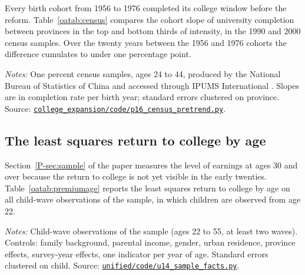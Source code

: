 \documentclass[11pt]{article}
\numberwithin{equation}{section}
\newcommand{\repourl}{https://github.com/JiachenJin1001/family-background-earnings-china}
\newcommand{\code}[1]{\href{\repourl/blob/main/#1}{\nolinkurl{#1}}}
\begin{document}
Every birth cohort from 1956 to 1976 completed its college window
before the reform. Table~\ref{oatab:census} compares the cohort slope
of university completion between provinces in the top and bottom
thirds of intensity, in the 1990 and 2000 census samples. Over the twenty years between the 1956 and 1976 cohorts the difference cumulates to under one percentage point.

\begin{table}[H]
\centering
\small
\caption{Difference in pre-reform cohort slopes of university
completion, provinces in the top third of intensity against the bottom
third.}
\label{oatab:census}

\par\smallskip
\begin{minipage}{0.92\textwidth}
\footnotesize\emph{Notes:} One percent census samples, ages 24 to 44,
produced by the National Bureau of Statistics of China and accessed
through IPUMS International \citep{IPUMSInternational}. Slopes are in
completion rate per birth year; standard errors clustered on province.
Source: \code{college_expansion/code/p16_census_pretrend.py}.
\end{minipage}
\end{table}

\subsection{The least squares return to college by age}

Section~\ref{P-sec:sample} of the paper measures the level of earnings
at ages 30 and over because the return to college is not yet visible in
the early twenties. Table~\ref{oatab:premiumage} reports the least squares return to college by age on all child-wave observations of the sample, in which children are observed from age 22.

\begin{table}[H]
\centering
\small
\caption{The least squares return to college by age at observation.}
\label{oatab:premiumage}

\par\smallskip
\begin{minipage}{0.92\textwidth}
\footnotesize\emph{Notes:} Child-wave observations of the sample (ages 22 to 55, at least two waves). Controls: family background,
parental income, gender, urban residence, province effects, survey-year
effects, one indicator per year of age. Standard errors clustered on
child. Source: \code{unified/code/u14_sample_facts.py}.
\end{minipage}
\end{table}
\end{document}
